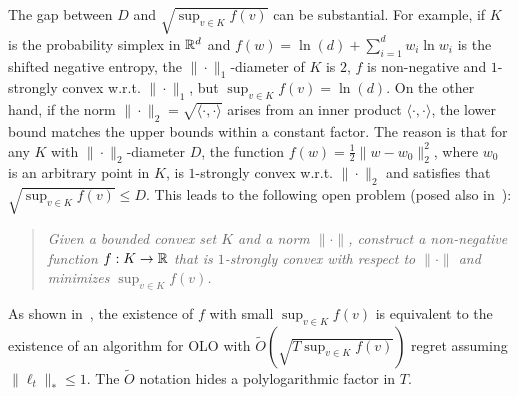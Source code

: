 The gap between $D$ and $\sqrt{\sup_{v \in K} f(v)}$ can be substantial.  For
example, if $K$ is the probability simplex in $\mathbb{R}^d$ and $f(w) = \ln(d) +
\sum_{i=1}^d w_i \ln w_i$ is the shifted negative entropy, the
$\|\cdot\|_1$-diameter of $K$ is $2$, $f$ is non-negative and $1$-strongly
convex w.r.t. $\|\cdot\|_1$, but $\sup_{v \in K} f(v) = \ln(d)$.  On the other
hand, if the norm $\|\cdot\|_2 = \sqrt{\langle \cdot, \cdot \rangle}$ arises
from an inner product $\langle \cdot, \cdot \rangle$, the lower bound matches
the upper bounds within a constant factor.  The reason is that for any $K$ with
$\|\cdot\|_2$-diameter $D$, the function $f(w) = \frac{1}{2} \|w - w_0\|_2^2$,
where $w_0$ is an arbitrary point in $K$, is $1$-strongly convex w.r.t.
$\|\cdot\|_2$ and satisfies that $\sqrt{\sup_{v \in K} f(v)} \le D$. This leads
to the following open problem (posed also in~\cite{Kwon-Mertikopoulos-2014}):
%
\begin{quotation}
\noindent
\emph{Given a bounded convex set $K$ and a norm $\|\cdot\|$, construct a non-negative
function $f:K \to \mathbb{R}$ that is $1$-strongly convex with respect to $\|\cdot\|$
and minimizes $\sup_{v \in K} f(v)$.}
\end{quotation}
%
As shown in~\cite{Srebro-Sridharan-Tewari-2011}, the existence of $f$ with small
$\sup_{v \in K} f(v)$ is equivalent to the existence of an algorithm for OLO with
$\widetilde O(\sqrt{T \sup_{v \in K} f(v)})$ regret assuming $\|\ell_t\|_* \le 1$.
The $\widetilde O$ notation hides a polylogarithmic factor in $T$.
